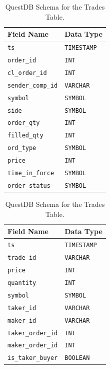 \documentclass[12pt,a4paper]{article}
\begin{document}
\begin{table}[H]
    \begin{minipage}[t]{0.48\textwidth}
        \centering
        \renewcommand{\arraystretch}{1.2}
        \begin{tabular}{|l|l|}
            \hline
            \textbf{Field Name} & \textbf{Data Type} \\
            \hline
            \texttt{ts} & \texttt{TIMESTAMP} \\
            \texttt{order\_id} & \texttt{INT} \\
            \texttt{cl\_order\_id} & \texttt{INT} \\
            \texttt{sender\_comp\_id} & \texttt{VARCHAR} \\
            \texttt{symbol} & \texttt{SYMBOL} \\
            \texttt{side} & \texttt{SYMBOL} \\
            \texttt{order\_qty} & \texttt{INT} \\
            \texttt{filled\_qty} & \texttt{INT} \\
            \texttt{ord\_type} & \texttt{SYMBOL} \\
            \texttt{price} & \texttt{INT} \\
            \texttt{time\_in\_force} & \texttt{SYMBOL} \\
            \texttt{order\_status} & \texttt{SYMBOL} \\
            \hline
        \end{tabular}
        \caption{QuestDB Schema for the Orders Table.}
        \label{tab:questdb_orders}
    \end{minipage}\hfill
    \begin{minipage}[t]{0.48\textwidth}
        \centering
        \renewcommand{\arraystretch}{1.2}
        \begin{tabular}{|l|l|}
            \hline
            \textbf{Field Name} & \textbf{Data Type} \\
            \hline
            \texttt{ts} & \texttt{TIMESTAMP} \\
            \texttt{trade\_id} & \texttt{VARCHAR} \\
            \texttt{price} & \texttt{INT} \\
            \texttt{quantity} & \texttt{INT} \\
            \texttt{symbol} & \texttt{SYMBOL} \\
            \texttt{taker\_id} & \texttt{VARCHAR} \\
            \texttt{maker\_id} & \texttt{VARCHAR} \\
            \texttt{taker\_order\_id} & \texttt{INT} \\
            \texttt{maker\_order\_id} & \texttt{INT} \\
            \texttt{is\_taker\_buyer} & \texttt{BOOLEAN} \\
            \hline
        \end{tabular}
        \caption{QuestDB Schema for the Trades Table.}
        \label{tab:questdb_trades}
    \end{minipage}
\end{table}
\end{document}
